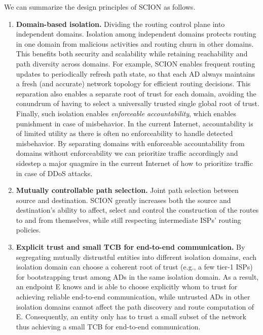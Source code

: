 We can summarize the design principles of SCION as follows.
\begin{enumerate}
\item {\bf Domain-based isolation.}
  Dividing the routing control plane into
  independent domains. Isolation among independent domains protects routing in
  one domain from malicious activities and routing churn in other domains. This
  benefits both security and scalability while retaining reachability and path
  diversity across domains. For example, SCION enables frequent routing updates
  to periodically refresh path state, so that each AD always maintains a fresh
  (and accurate) network topology for efficient routing decisions. This
  separation also enables a separate root of trust for each domain, avoiding the
  conundrum of having to select a universally trusted single global root of
  trust. Finally, such isolation enables \textit{enforceable accountability},
  which enables punishment in case of misbehavior. In the current Internet,
  accountability is of limited utility as there is often no enforceability to
  handle detected misbehavior. By separating domains with enforceable
  accountability from domains without enforceability we can prioritize traffic
  accordingly and sidestep a major quagmire in the current Internet of how to
  prioritize traffic in case of DDoS attacks.
\item {\bf Mutually controllable path selection.} Joint path selection between
  source and destination. SCION greatly increases both the source and
  destination’s ability to affect, select and control the construction of the
  routes to and from themselves, while still respecting intermediate ISPs’
  routing policies.
\item {\bf Explicit trust and small TCB for end-to-end communication.} By
  segregating mutually distrustful entities into different isolation domains, each
  isolation domain can choose a coherent root of trust (e.g., a few tier-1 ISPs) for
  bootstrapping trust among ADs in the same isolation domain. As a result, an
  endpoint E knows and is able to choose explicitly whom to trust for achieving
  reliable end-to-end communication, while untrusted ADs in other isolation domains
  cannot affect the path discovery and route computation of E. Consequently, an
  entity only has to trust a small subset of the network thus achieving a small
  TCB for end-to-end communication.
\end{enumerate}


